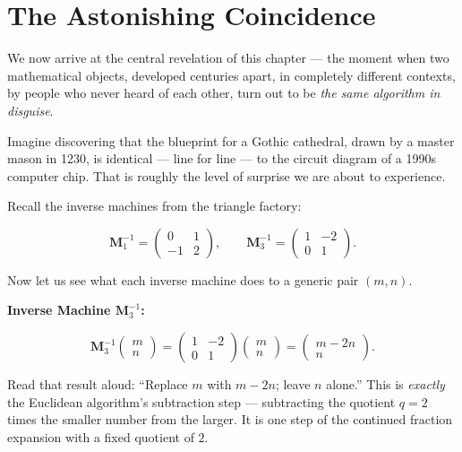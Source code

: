 \section{The Astonishing Coincidence}\label{ch2-the-astonishing-coincidence}

We now arrive at the central revelation of this chapter --- the moment when two mathematical objects, developed centuries apart, in completely different contexts, by people who never heard of each other, turn out to be \emph{the same algorithm in disguise}.

Imagine discovering that the blueprint for a Gothic cathedral, drawn by a master mason in 1230, is identical --- line for line --- to the circuit diagram of a 1990s computer chip. That is roughly the level of surprise we are about to experience.

Recall the inverse machines from the triangle factory:

\[
\mathbf{M}_1^{-1} = \begin{pmatrix} 0 & 1 \\ -1 & 2 \end{pmatrix}, \qquad
\mathbf{M}_3^{-1} = \begin{pmatrix} 1 & -2 \\ 0 & 1 \end{pmatrix}.
\]

Now let us see what each inverse machine does to a generic pair \((m, n)\).

\textbf{Inverse Machine \(\mathbf{M}_3^{-1}\):}

\[
\mathbf{M}_3^{-1} \begin{pmatrix} m \\ n \end{pmatrix} = \begin{pmatrix} 1 & -2 \\ 0 & 1 \end{pmatrix} \begin{pmatrix} m \\ n \end{pmatrix} = \begin{pmatrix} m - 2n \\ n \end{pmatrix}.
\]

Read that result aloud: ``Replace \(m\) with \(m - 2n\); leave \(n\) alone.'' This is \emph{exactly} the Euclidean algorithm's subtraction step --- subtracting the quotient \(q = 2\) times the smaller number from the larger. It is one step of the continued fraction expansion with a fixed quotient of \(2\).

